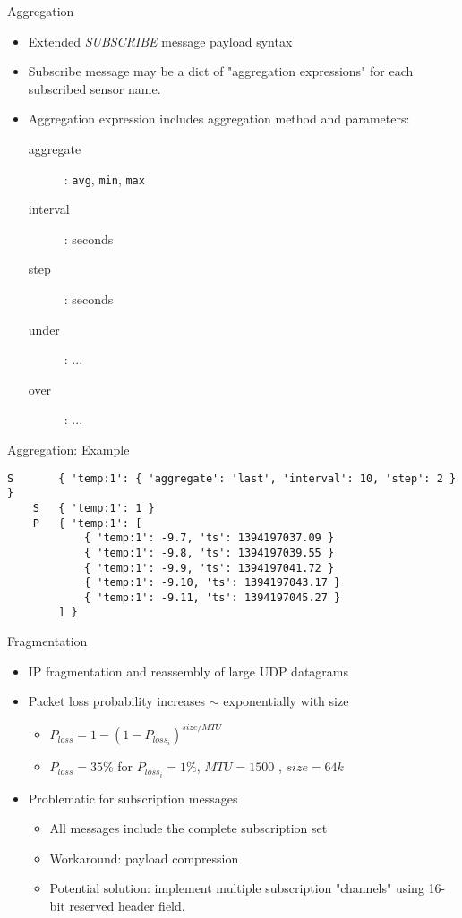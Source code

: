 \documentclass{beamer}
\begin{document}
\begin{frame}{Aggregation}
\begin{itemize}
	\item Extended \emph{SUBSCRIBE} message payload syntax
	\item Subscribe message may be a dict of "aggregation expressions" for each subscribed sensor name.
	\item Aggregation expression includes aggregation method and parameters:
	\begin{description}
		\item[aggregate]: \texttt{avg}, \texttt{min}, \texttt{max}
		\item[interval]: seconds
		\item[step]: seconds
		\item[under]: ...
		\item[over]: ...
	\end{description}
\end{itemize}
\end{frame}

\begin{frame}[fragile]{Aggregation: Example}
\scriptsize
\begin{verbatim}
S       { 'temp:1': { 'aggregate': 'last', 'interval': 10, 'step': 2 } }
    S   { 'temp:1': 1 }
    P   { 'temp:1': [
            { 'temp:1': -9.7, 'ts': 1394197037.09 }
            { 'temp:1': -9.8, 'ts': 1394197039.55 }
            { 'temp:1': -9.9, 'ts': 1394197041.72 }
            { 'temp:1': -9.10, 'ts': 1394197043.17 }
            { 'temp:1': -9.11, 'ts': 1394197045.27 }
        ] }
\end{verbatim}
\end{frame}

\begin{frame}{Fragmentation}
\begin{itemize}
	\item IP fragmentation and reassembly of large UDP datagrams
	\item 	Packet loss probability increases $\sim$ exponentially with size
	\begin{itemize}
		\item $P_{loss} = 1 - (1 - P_{loss_i})^{size / MTU}$
		\item $P_{loss} = 35\%$ for $ P_{loss_i} = 1\% $, $MTU = 1500$ , $size = 64k$	
	\end{itemize}
	\item Problematic for subscription messages
	\begin{itemize}
		\item All messages include the complete subscription set
		\item Workaround: payload compression
		\item Potential solution: implement multiple subscription "channels" using 16-bit reserved header field.
	\end{itemize}
\end{itemize}
\end{frame}
\end{document}
